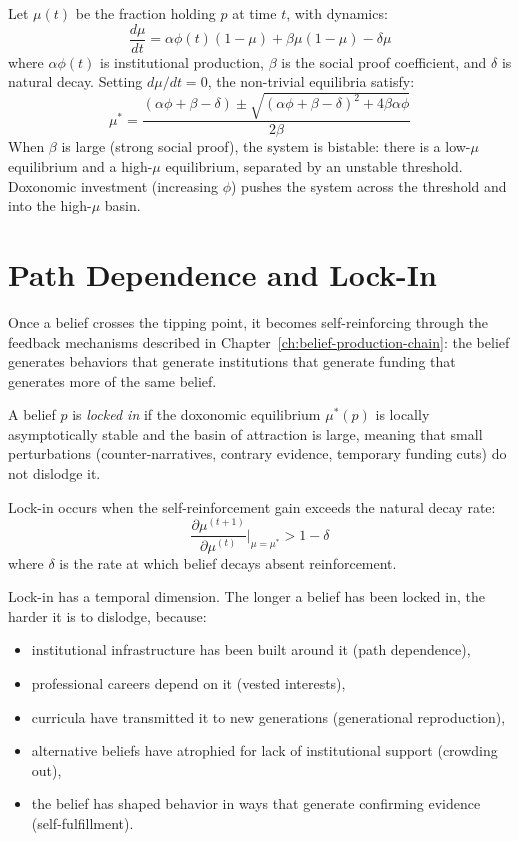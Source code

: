 \begin{model}
\label{mod:cascade}
Let $\mu(t)$ be the fraction holding $p$ at time $t$, with dynamics:
\[
  \frac{d\mu}{dt} = \alpha\phi(t)(1-\mu) + \beta\mu(1-\mu) - \delta\mu
\]
where $\alpha\phi(t)$ is institutional production, $\beta$ is the social proof coefficient, and $\delta$ is natural decay.
Setting $d\mu/dt = 0$, the non-trivial equilibria satisfy:
\[
  \mu^* = \frac{(\alpha\phi + \beta - \delta) \pm \sqrt{(\alpha\phi + \beta - \delta)^2 + 4\beta\alpha\phi}}{2\beta}
\]
When $\beta$ is large (strong social proof), the system is bistable: there is a low-$\mu$ equilibrium and a high-$\mu$ equilibrium, separated by an unstable threshold.
Doxonomic investment (increasing $\phi$) pushes the system across the threshold and into the high-$\mu$ basin.
\end{model}


\section{Path Dependence and Lock-In}
\label{sec:ch8-lock-in}

Once a belief crosses the tipping point, it becomes self-reinforcing through the feedback mechanisms described in Chapter~\ref{ch:belief-production-chain}: the belief generates behaviors that generate institutions that generate funding that generates more of the same belief.

\begin{definition}
\label{def:lock-in}
A belief $p$ is \emph{locked in} if the doxonomic equilibrium $\mu^*(p)$ is locally asymptotically stable and the basin of attraction is large, meaning that small perturbations (counter-narratives, contrary evidence, temporary funding cuts) do not dislodge it.
\end{definition}

\begin{proposition}
\label{prop:lock-in}
Lock-in occurs when the self-reinforcement gain exceeds the natural decay rate:
\[
  \frac{\partial \mu^{(t+1)}}{\partial \mu^{(t)}} \bigg|_{\mu = \mu^*} > 1 - \delta
\]
where $\delta$ is the rate at which belief decays absent reinforcement.
\end{proposition}

Lock-in has a temporal dimension.
The longer a belief has been locked in, the harder it is to dislodge, because:
\begin{itemize}[nosep]
  \item institutional infrastructure has been built around it (path dependence),
  \item professional careers depend on it (vested interests),
  \item curricula have transmitted it to new generations (generational reproduction),
  \item alternative beliefs have atrophied for lack of institutional support (crowding out),
  \item the belief has shaped behavior in ways that generate confirming evidence (self-fulfillment).
\end{itemize}

